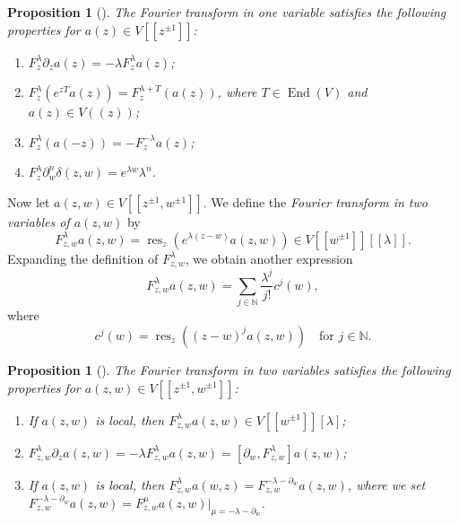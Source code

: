 \documentclass[a4paper, 12pt, reqno]{amsart}
\newtheorem{proposition}[theorem]{Proposition}
\theoremstyle{remark}
\DeclareMathOperator{\End}{End}
\DeclareMathOperator{\res}{res}
\begin{document}
\begin{proposition}[{\cite[Proposition 1.5.2]{nozaradan_introduction_2008}}]
  \label{prp:2}
  The Fourier transform in one variable satisfies the following properties for $a(z) \in V[[z^{\pm 1}]]$:
  \begin{enumerate}
  \item $F^{\lambda}_z\partial_za(z) = -\lambda F^{\lambda}_za(z)$;
  \item $F^{\lambda}_z(e^{zT}a(z)) = F^{\lambda + T}_z(a(z))$, where $T \in \End(V)$ and $a(z) \in V((z))$;
  \item $F^{\lambda}_z(a(-z)) = -F^{-\lambda}_za(z)$;
  \item $F^{\lambda}_z\partial^n_w\delta(z, w) = e^{\lambda w}\lambda^n$.
  \end{enumerate}
\end{proposition}

Now let $a(z, w) \in V[[z^{\pm 1}, w^{\pm 1}]]$.
We define the \emph{Fourier transform in two variables of $a(z, w)$} by
\begin{equation*}
  F^{\lambda}_{z, w}a(z, w) = \res_z(e^{\lambda(z - w)}a(z, w)) \in V[[w^{\pm 1}]][[\lambda]].
\end{equation*}
Expanding the definition of $F^{\lambda}_{z, w}$, we obtain another expression
\begin{equation*}
  F^{\lambda}_{z, w}a(z, w) = \sum_{j \in \mathbb{N}}\frac{\lambda^j}{j!}c^j(w),
\end{equation*}
where
\begin{equation*}
  c^j(w) = \res_z((z - w)^ja(z, w)) \quad \text{for $j \in \mathbb{N}$}.
\end{equation*}

\begin{proposition}[{\cite[Proposition 1.5.4]{nozaradan_introduction_2008}}]
  \label{prp:3}
  The Fourier transform in two variables satisfies the following properties for $a(z, w) \in V[[z^{\pm 1}, w^{\pm 1}]]$:
  \begin{enumerate}
  \item If $a(z, w)$ is local, then $F^{\lambda}_{z, w}a(z, w) \in V[[w^{\pm 1}]][\lambda]$;
  \item $F^{\lambda}_{z, w}\partial_za(z, w) = -\lambda F^{\lambda}_{z, w}a(z, w) = [\partial_w, F^{\lambda}_{z, w}]a(z, w)$;
  \item If $a(z, w)$ is local, then $F^{\lambda}_{z, w}a(w, z) = F^{-\lambda - \partial_w}_{z, w}a(z, w)$, where we set $F^{-\lambda - \partial_w}_{z, w}a(z, w) = F^{\mu}_{z, w}a(z, w)|_{\mu = -\lambda - \partial_w}$.
  \end{enumerate}
\end{proposition}
\end{document}
